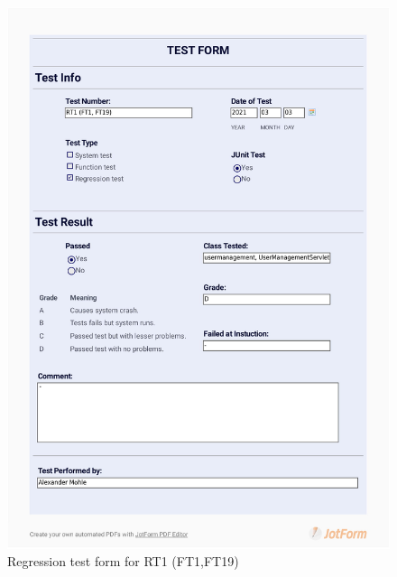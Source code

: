 \documentclass{article}
\begin{document}
  \begin{figure}
     \centering
     \includegraphics[width=13cm]{images/2021-03-03_Alexander_RT1(FT1, FT19)-1.jpg}
     \renewcommand\figurename{Figure}
     \caption{Regression test form for RT1 (FT1,FT19)}
     \label{fig:my_label}
 \end{figure}
 
\end{document}
